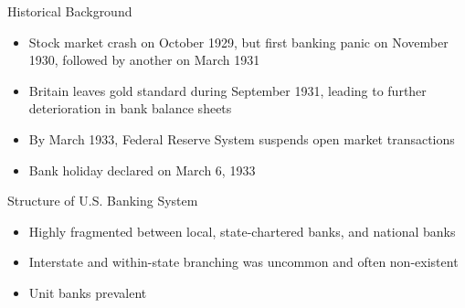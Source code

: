 \documentclass[11pt]{beamer}
\begin{document}
\begin{frame}{Historical Background}
\begin{itemize}
\item Stock market crash on October 1929, but first banking panic on November 1930, followed by another on March 1931
\item Britain leaves gold standard during September 1931, leading to further deterioration in bank balance sheets
\item By March 1933, Federal Reserve System suspends open market transactions
\item Bank holiday declared on March 6, 1933
\end{itemize}
\end{frame}

\begin{frame}{Structure of U.S. Banking System}
\begin{itemize}
\item Highly fragmented between local, state-chartered banks, and national banks
\item Interstate and within-state branching was uncommon and often non-existent
\item Unit banks prevalent
\end{itemize}
\end{frame}
\end{document}
